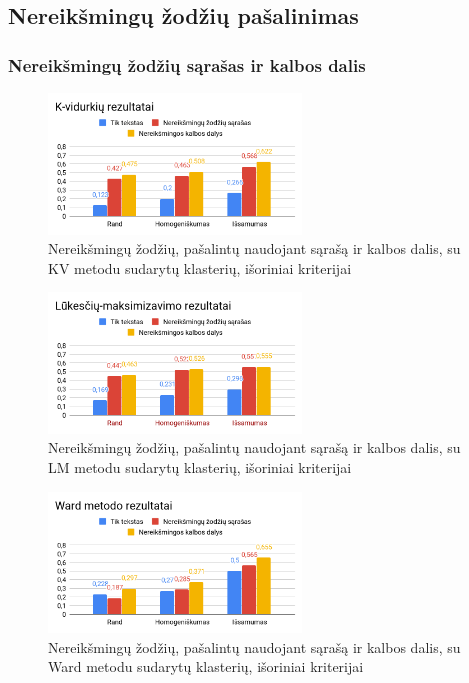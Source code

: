 \documentclass{VUMIFInfBakalaurinis}
\begin{document}
\subsection{Nereikšmingų žodžių pašalinimas}

\subsubsection{Nereikšmingų žodžių sąrašas ir kalbos dalis}\label{stoptest}

\begin{figure}[H]
	\centering
	\includegraphics[width=0.6\textwidth]{./img/image15.png}
  \caption{Nereikšmingų žodžių, pašalintų naudojant sąrašą ir kalbos dalis, su KV
  metodu sudarytų klasterių, išoriniai kriterijai}
\end{figure}

\begin{figure}[H]
	\centering
	\includegraphics[width=0.6\textwidth]{./img/image12.png}
  \caption{Nereikšmingų žodžių, pašalintų naudojant sąrašą ir kalbos dalis, su LM
  metodu sudarytų klasterių, išoriniai kriterijai}
\end{figure}

\begin{figure}[H]
	\centering
	\includegraphics[width=0.6\textwidth]{./img/image19.png}
  \caption{Nereikšmingų žodžių, pašalintų naudojant sąrašą ir kalbos dalis, su Ward
  metodu sudarytų klasterių, išoriniai kriterijai}
\end{figure}
\end{document}
